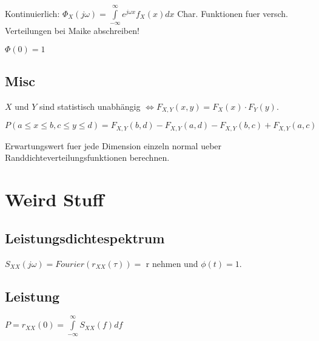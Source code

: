 \documentclass[10pt,a4paper]{article}
\begin{document}
Kontinuierlich: $\Phi_X(j\omega) = \int\limits_{-\infty}^\infty e^{j\omega x} f_X(x)dx$ Char. Funktionen fuer versch. Verteilungen bei Maike abschreiben!

$\Phi(0)=1$

\subsection{Misc}
$X$ und $Y$ sind statistisch unabhängig $ \Leftrightarrow F_{X,Y}(x,y) = F_X(x)\cdot F_Y(y)$.

$P(a \leq x\leq b, c\leq y\leq d) =
F_{X,Y}(b,d)
-F_{X,Y}(a,d)
-F_{X,Y}(b,c)
+F_{X,Y}(a,c)$

Erwartungswert fuer jede Dimension einzeln normal ueber Randdichteverteilungsfunktionen berechnen.

\section{Weird Stuff}
\subsection{Leistungsdichtespektrum}
$S_{XX}(j\omega) = Fourier(r_{XX}(\tau)) = $ r nehmen und $\phi(t)=1$.

\subsection{Leistung}
$P=r_{XX}(0)=\int\limits_{-\infty}^\infty S_{XX}(f) df$
\end{document}
